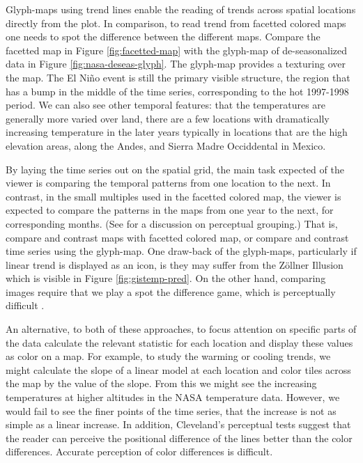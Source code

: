 \documentclass[oneside]{article}
\begin{document}
Glyph-maps using trend lines enable the reading of trends across spatial locations directly from the plot. In comparison, to read trend from facetted colored maps one needs to spot the difference between the different maps.  Compare the facetted map in Figure \ref{fig:facetted-map} with the glyph-map of de-seasonalized data in Figure \ref{fig:nasa-deseas-glyph}. The glyph-map provides a texturing over the map. The El Ni\~no event is still the primary visible structure, the region that has a bump in the middle of the time series, corresponding to the hot 1997-1998 period. We can also see other temporal features: that the temperatures are generally more varied over land, there are a few locations with dramatically increasing temperature in the later years typically in locations that are the high elevation areas, along the Andes, and Sierra Madre Occiddental in Mexico.

By laying the time series out on the spatial grid, the main task expected of the viewer is comparing the temporal patterns from one location to the next. In contrast, in the small multiples used in the facetted colored map, the viewer is expected to compare the patterns in the maps from one year to the next, for corresponding months. (See \citet{carr:1999} for a discussion on perceptual grouping.) That is, compare and contrast maps with facetted colored map, or compare and contrast time series using the glyph-map. One draw-back of the glyph-maps, particularly if linear trend is displayed as an icon, is they may suffer from the Z\"ollner Illusion \citep{Zollner} which is visible in Figure \ref{fig:gistemp-pred}. On the other hand, comparing images require that we play a spot the difference game, which is perceptually difficult \citet{busey}.

An alternative, to both of these approaches, to focus attention on specific parts of the data calculate the relevant statistic for each location and display these values as color on a map. For example, to study the warming or cooling trends, we might calculate the slope of a linear model at each location and color tiles across the map by the value of the slope. From this we might see the increasing temperatures at higher altitudes in the NASA temperature data. However, we would fail to see the finer points of the time series, that the increase is not as simple as a linear increase. In addition, Cleveland's \citep{cleveland:1993a} perceptual tests suggest that the reader can perceive the positional difference of the lines better than the color differences. Accurate perception of color differences is difficult.
\end{document}

